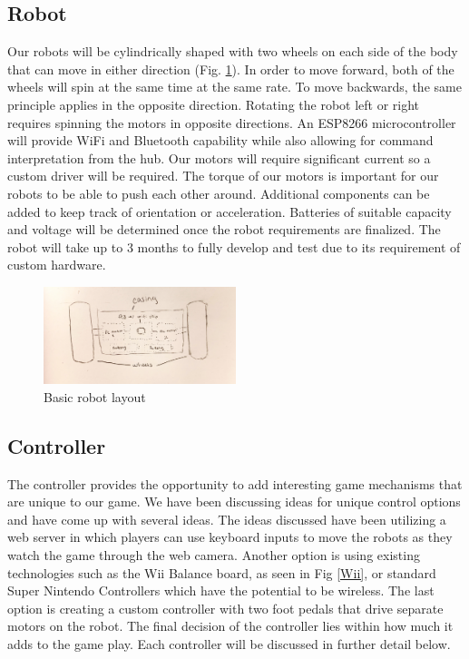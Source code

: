 \documentclass[11pt]{ieeeconf}
\begin{document}
\subsection{Robot}

Our robots will be cylindrically shaped with two wheels on each side of the body that can move in either direction (Fig. \ref{RobotFig}). In order to move forward, both of the wheels will spin at the same time at the same rate. To move backwards, the same principle applies in the opposite direction. Rotating the robot left or right requires spinning the motors in opposite directions. An ESP8266 microcontroller will provide WiFi and Bluetooth capability while also allowing for command interpretation from the hub. Our motors will require significant current so a custom driver will be required. The torque of our motors is important for our robots to be able to push each other around. Additional components can be added to keep track of orientation or acceleration. Batteries of suitable capacity and voltage will be determined once the robot requirements are finalized. The robot will take up to 3 months to fully develop and test due to its requirement of custom hardware. 

 \begin{figure}[H]
  \centering
      \includegraphics[width=0.5\textwidth]{images/RobotSketch.pdf}
        \caption{Basic robot layout}
        \label{RobotFig}
\end{figure}

\subsection{Controller}
The controller provides the opportunity to add interesting game mechanisms that are unique to our game. We have been discussing ideas for unique control options and have come up with several ideas. The ideas discussed have been utilizing a web server in which players can use keyboard inputs to move the robots as they watch the game through the web camera. Another option is using existing technologies such as the Wii Balance board, as seen in Fig \ref{Wii}, or standard Super Nintendo Controllers which have the potential to be wireless. The last option is creating a custom controller with two foot pedals that drive separate motors on the robot. The final decision of the controller lies within how much it adds to the game play. Each controller will be discussed in further detail below.
\end{document}
